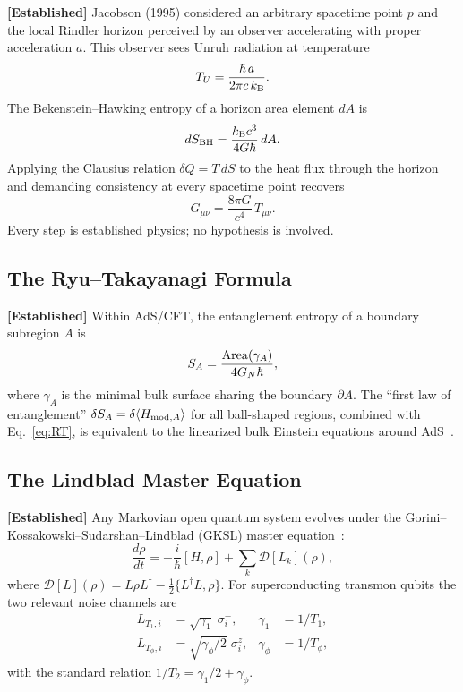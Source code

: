 \documentclass[12pt,letterpaper]{article}
\theoremstyle{definition}
\theoremstyle{remark}
\newcommand{\established}{\textbf{[Established]}}
\newcommand{\hb}{\hbar}
\newcommand{\kB}{k_{\rm B}}
\newcommand{\gammaone}{\gamma_{1}}
\newcommand{\gammaphi}{\gamma_{\phi}}
\newcommand{\half}{\tfrac{1}{2}}
\begin{document}
\established{} Jacobson (1995) considered an arbitrary spacetime point $p$ and the
local Rindler horizon perceived by an observer accelerating with proper acceleration $a$.
This observer sees Unruh radiation at temperature
\begin{equation}
T_U = \frac{\hb\,a}{2\pi c\,\kB}.
\end{equation}
The Bekenstein--Hawking entropy of a horizon area element $dA$ is
\begin{equation}
dS_{\rm BH} = \frac{\kB c^3}{4G\hb}\,dA.
\end{equation}
Applying the Clausius relation $\delta Q = T\,dS$ to the heat flux through the horizon
and demanding consistency at every spacetime point recovers
\begin{equation}
G_{\mu\nu} = \frac{8\pi G}{c^4}\,T_{\mu\nu}.
\label{eq:EFE}
\end{equation}
Every step is established physics; no hypothesis is involved.

\subsection{The Ryu--Takayanagi Formula}

\established{} Within AdS/CFT, the entanglement entropy of a boundary subregion $A$
is~\cite{ryu2006}
\begin{equation}
S_A = \frac{{\rm Area}(\gamma_A)}{4G_N\hb},
\label{eq:RT}
\end{equation}
where $\gamma_A$ is the minimal bulk surface sharing the boundary $\partial A$.
The ``first law of entanglement'' $\delta S_A = \delta\langle H_{{\rm mod},A}\rangle$
for all ball-shaped regions, combined with Eq.~\eqref{eq:RT}, is equivalent to the
linearized bulk Einstein equations around AdS~\cite{faulkner2014,lashkari2014}.

\subsection{The Lindblad Master Equation}

\established{} Any Markovian open quantum system evolves under the
Gorini--Kossakowski--Sudarshan--Lindblad (GKSL) master equation~\cite{lindblad1976,
gorini1976}:
\begin{equation}
\frac{d\rho}{dt} = -\frac{i}{\hb}[H,\rho]
  + \sum_k \mathcal{D}[L_k](\rho),
\end{equation}
where $\mathcal{D}[L](\rho) = L\rho L^\dagger - \half\{L^\dagger L,\rho\}$.
For superconducting transmon qubits the two relevant noise channels are
\begin{align}
L_{T_1,i}   &= \sqrt{\gammaone}\;\sigma_i^-,
  &\gammaone  &= 1/T_1, \\
L_{T_\phi,i} &= \sqrt{\gammaphi/2}\;\sigma_i^z,
  &\gammaphi  &= 1/T_\phi,
\end{align}
with the standard relation $1/T_2 = \gammaone/2 + \gammaphi$.
\end{document}
